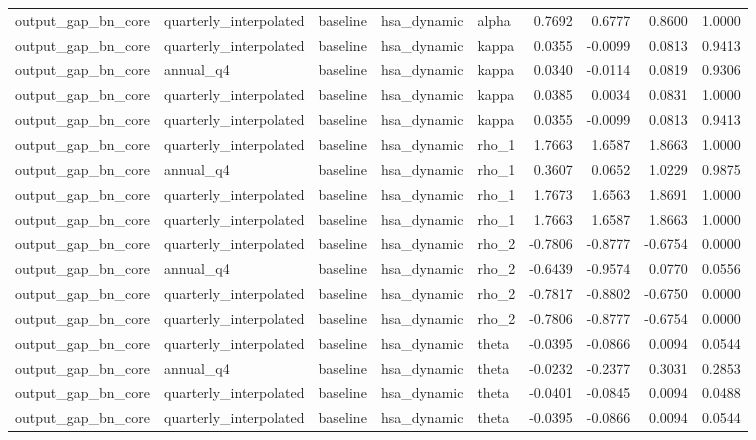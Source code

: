 \begin{tabular}{lllllrrrr}
output\_gap\_bn\_core & quarterly\_interpolated & baseline & hsa\_dynamic & alpha & 0.7692 & 0.6777 & 0.8600 & 1.0000 \\
output\_gap\_bn\_core & quarterly\_interpolated & baseline & hsa\_dynamic & kappa & 0.0355 & -0.0099 & 0.0813 & 0.9413 \\
output\_gap\_bn\_core & annual\_q4 & baseline & hsa\_dynamic & kappa & 0.0340 & -0.0114 & 0.0819 & 0.9306 \\
output\_gap\_bn\_core & quarterly\_interpolated & baseline & hsa\_dynamic & kappa & 0.0385 & 0.0034 & 0.0831 & 1.0000 \\
output\_gap\_bn\_core & quarterly\_interpolated & baseline & hsa\_dynamic & kappa & 0.0355 & -0.0099 & 0.0813 & 0.9413 \\
output\_gap\_bn\_core & quarterly\_interpolated & baseline & hsa\_dynamic & rho\_1 & 1.7663 & 1.6587 & 1.8663 & 1.0000 \\
output\_gap\_bn\_core & annual\_q4 & baseline & hsa\_dynamic & rho\_1 & 0.3607 & 0.0652 & 1.0229 & 0.9875 \\
output\_gap\_bn\_core & quarterly\_interpolated & baseline & hsa\_dynamic & rho\_1 & 1.7673 & 1.6563 & 1.8691 & 1.0000 \\
output\_gap\_bn\_core & quarterly\_interpolated & baseline & hsa\_dynamic & rho\_1 & 1.7663 & 1.6587 & 1.8663 & 1.0000 \\
output\_gap\_bn\_core & quarterly\_interpolated & baseline & hsa\_dynamic & rho\_2 & -0.7806 & -0.8777 & -0.6754 & 0.0000 \\
output\_gap\_bn\_core & annual\_q4 & baseline & hsa\_dynamic & rho\_2 & -0.6439 & -0.9574 & 0.0770 & 0.0556 \\
output\_gap\_bn\_core & quarterly\_interpolated & baseline & hsa\_dynamic & rho\_2 & -0.7817 & -0.8802 & -0.6750 & 0.0000 \\
output\_gap\_bn\_core & quarterly\_interpolated & baseline & hsa\_dynamic & rho\_2 & -0.7806 & -0.8777 & -0.6754 & 0.0000 \\
output\_gap\_bn\_core & quarterly\_interpolated & baseline & hsa\_dynamic & theta & -0.0395 & -0.0866 & 0.0094 & 0.0544 \\
output\_gap\_bn\_core & annual\_q4 & baseline & hsa\_dynamic & theta & -0.0232 & -0.2377 & 0.3031 & 0.2853 \\
output\_gap\_bn\_core & quarterly\_interpolated & baseline & hsa\_dynamic & theta & -0.0401 & -0.0845 & 0.0094 & 0.0488 \\
output\_gap\_bn\_core & quarterly\_interpolated & baseline & hsa\_dynamic & theta & -0.0395 & -0.0866 & 0.0094 & 0.0544 \\

\end{tabular}

